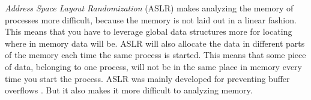 \textit{Address Space Layout Randomization} (ASLR) makes analyzing the memory 
of processes more difficult, because the memory is not laid out in a linear 
fashion. This means that you have to leverage global data structures more for
locating where in memory data will be. ASLR will also allocate the data in 
different parts of the memory each time the same process is started. This means
that some piece of data, belonging to one process,  will not be in the same 
place in memory every time you start the process. ASLR was mainly developed for 
preventing buffer overflows \cite{prot_aslr}. But it also makes it more difficult
to analyzing memory.\\





%
%

